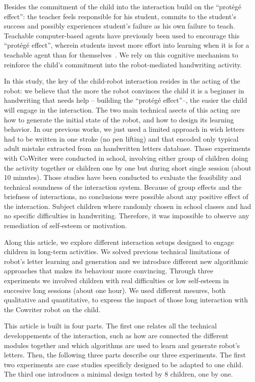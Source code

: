 \documentclass{sig-alternate}
\begin{document}
Besides the commitment of the child into the interaction build on the
``prot\'eg\'e effect'': the teacher feels responsible for his student, commits
to the student's success and possibly experiences student's failure as his own
failure to teach. Teachable computer-based agents have previously been used to
encourage this ``prot\'eg\'e effect'', wherein students invest more effort into
learning when it is for a teachable agent than for themselves~\cite{Chase2009}.
We rely on this cognitive mechanism to reinforce the child's commitment into the
robot-mediated handwriting activity.

In this study, the key of the child-robot interaction resides in the acting of
the robot: we believe that the more the robot convinces the child it is a beginner in
handwriting that needs help -- building the ``prot\'eg\'e effect''--, the easier
the child will engage in the interaction. The two main technical asects of this
acting are how to generate the initial state of the robot, and how to design its
learning behavior. In our previous works, we just used a limited approach in wich
letters had to be written in one stroke (no pen lifting) and that encoded only
typical adult mistake extracted from an handwritten letters database. Those
experiments with CoWriter were conducted in school, involving either group of
children doing the activity together or children
one by one but during short single session (about 10 minutes). Those
studies have been conducted to evaluate the feasibility and technical soundness
of the interaction system. Because of group effects and the briefness of
interactions, no conclusions were possible about any positive effect of the
interaction. Subject children where randomly chosen in school
classes and had no specific difficulties in handwriting. Therefore, it was
impossible to observe any remediation of self-esteem or motivation.

Along this article, we explore different interaction setups designed to engage
children in long-term activities. We solved previous technical limitations of
robot's letter learning and generation and we introduce different new
algorithmic approaches that makes its behaviour more convincing. Through three
experiments we involved children with real difficulties or low self-esteem
in succesive long sessions (about one hour). We used different mesures,
both qualitative and quantitative, to express the impact of those long
interaction with the Cowriter robot on the child.

This article is built in four parts. The first one relates all the technical
developpements of the interaction, such as how are connected the different modules
together and which algorithms are used to learn and generate robot's letters.
Then, the following three parts describe our three experiments. The first two
experiments are case studies specificly designed to be adapted to one child. The
third one introduces a minimal design tested by 8 children, one by one. 
\end{document}
